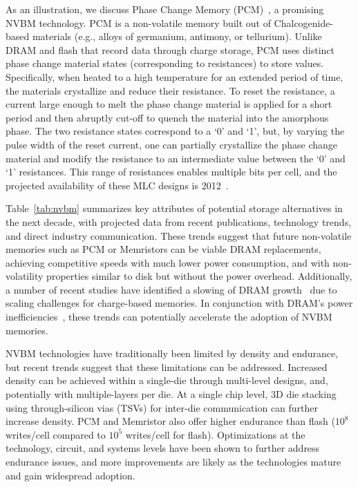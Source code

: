 As an illustration, we discuss Phase Change Memory
(PCM)~\cite{Raoux08}, a promising NVBM technology. PCM is a
non-volatile memory built out of Chalcogenide-based materials (e.g.,
alloys of germanium, antimony, or tellurium).  Unlike DRAM and flash
that record data through charge storage, PCM uses distinct phase
change material states (corresponding to resistances) to store
values. Specifically, when heated to a high temperature for an
extended period of time, the materials crystallize and reduce their
resistance.  To reset the resistance, a current large enough to melt
the phase change material is applied for a short period and then
abruptly cut-off to quench the material into the amorphous phase.  The
two resistance states correspond to a `0' and `1', but, by varying the
pulse width of the reset current, one can partially crystallize the
phase change material and modify the resistance to an intermediate
value between the `0' and `1' resistances. This range of resistances
enables multiple bits per cell, and the projected availability of these
MLC designs is 2012~\citep{ITRS09}.



Table~\ref{tab:nvbm} summarizes key attributes of potential storage
alternatives in the next decade, with projected data from recent
publications, technology trends, and direct industry communication.
These trends suggest that future non-volatile memories such as PCM or
Memristors can be viable DRAM replacements, achieving competitive
speeds with much lower power consumption, and with non-volatility
properties similar to disk but without the power
overhead. Additionally, a number of recent studies have identified a
slowing of DRAM
growth~\citep{ITRS09,ITRS07,Lee09b,Mandelman02,Mueller05,Qureshi09b,Zhou09}
due to scaling challenges for charge-based memories.  In conjunction
with DRAM's power inefficiencies~\citep{Bergman08,Freitas08}, these
trends can potentially accelerate the adoption of NVBM memories.

NVBM technologies have traditionally been limited by density and
endurance, but recent trends suggest that these limitations can be
addressed.  Increased density can be achieved within a single-die
through multi-level designs, and, potentially with multiple-layers per
die.  At a single chip level, 3D die stacking using through-silicon
vias (TSVs) for inter-die communication can further increase
density. PCM and Memristor also offer higher endurance
than flash ($10^8$ writes/cell compared to $10^5$ writes/cell for
flash).  Optimizations at the technology, circuit, and systems levels
have been shown to further address endurance issues, and more
improvements are likely as the technologies mature and gain widespread
adoption.

